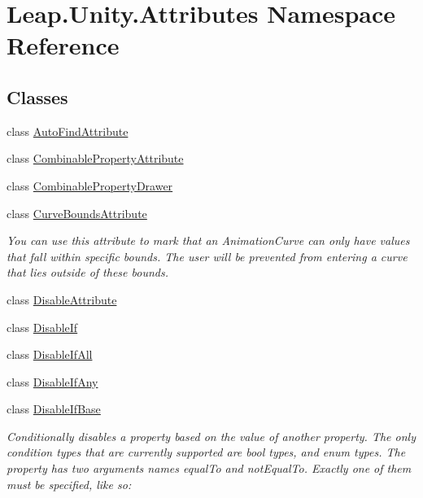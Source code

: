 \hypertarget{namespace_leap_1_1_unity_1_1_attributes}{}\section{Leap.\+Unity.\+Attributes Namespace Reference}
\label{namespace_leap_1_1_unity_1_1_attributes}
\subsection*{Classes}
\begin{DoxyCompactItemize}
\item 
class \mbox{\hyperlink{class_leap_1_1_unity_1_1_attributes_1_1_auto_find_attribute}{Auto\+Find\+Attribute}}
\item 
class \mbox{\hyperlink{class_leap_1_1_unity_1_1_attributes_1_1_combinable_property_attribute}{Combinable\+Property\+Attribute}}
\item 
class \mbox{\hyperlink{class_leap_1_1_unity_1_1_attributes_1_1_combinable_property_drawer}{Combinable\+Property\+Drawer}}
\item 
class \mbox{\hyperlink{class_leap_1_1_unity_1_1_attributes_1_1_curve_bounds_attribute}{Curve\+Bounds\+Attribute}}
\begin{DoxyCompactList}\small\item\em You can use this attribute to mark that an Animation\+Curve can only have values that fall within specific bounds. The user will be prevented from entering a curve that lies outside of these bounds. \end{DoxyCompactList}\item 
class \mbox{\hyperlink{class_leap_1_1_unity_1_1_attributes_1_1_disable_attribute}{Disable\+Attribute}}
\item 
class \mbox{\hyperlink{class_leap_1_1_unity_1_1_attributes_1_1_disable_if}{Disable\+If}}
\item 
class \mbox{\hyperlink{class_leap_1_1_unity_1_1_attributes_1_1_disable_if_all}{Disable\+If\+All}}
\item 
class \mbox{\hyperlink{class_leap_1_1_unity_1_1_attributes_1_1_disable_if_any}{Disable\+If\+Any}}
\item 
class \mbox{\hyperlink{class_leap_1_1_unity_1_1_attributes_1_1_disable_if_base}{Disable\+If\+Base}}
\begin{DoxyCompactList}\small\item\em Conditionally disables a property based on the value of another property. The only condition types that are currently supported are bool types, and enum types. The property has two arguments names \textquotesingle{}equal\+To\textquotesingle{} and \textquotesingle{}not\+Equal\+To\textquotesingle{}. Exactly one of them must be specified, like so\+: \end{DoxyCompactList}\item 

\end{DoxyCompactItemize}
